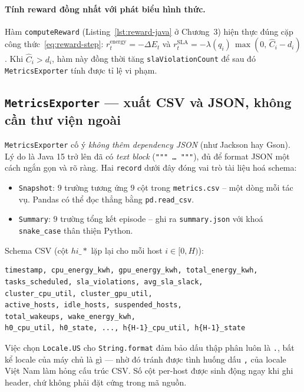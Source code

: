\paragraph{Tính reward đồng nhất với phát biểu hình thức.}
Hàm \texttt{computeReward} (Listing~\ref{lst:reward-java} ở Chương~3)
hiện thực đúng cặp công thức~\eqref{eq:reward-step}:
$r^{\mathrm{energy}}_t = -\Delta E_t$ và
$r^{\mathrm{SLA}}_t = -\lambda(q_i)\,\max(0,\,\hat C_i - d_i)$. Khi
$\hat C_i > d_i$, hàm này đồng thời tăng \texttt{slaViolationCount}
để sau đó \texttt{MetricsExporter} tính được tỉ lệ vi phạm.

\subsection{\texttt{MetricsExporter} --- xuất CSV và JSON, không cần thư viện ngoài}
\label{ssec:impl-export}

\texttt{MetricsExporter} cố ý \emph{không thêm dependency JSON} (như
Jackson hay Gson). Lý do là Java 15 trở lên đã có \emph{text block}
(\texttt{"""\,\dots\,"""}), đủ để format JSON một cách ngắn gọn và rõ
ràng. Hai \texttt{record} dưới đây đóng vai trò tài liệu hoá schema:

\begin{itemize}
  \item \texttt{Snapshot}: $9$ trường tương ứng $9$ cột trong
        \texttt{metrics.csv} -- một dòng mỗi tác vụ. Pandas có thể đọc
        thẳng bằng \texttt{pd.read\_csv}.
  \item \texttt{Summary}: $9$ trường tổng kết episode -- ghi ra
        \texttt{summary.json} với khoá \texttt{snake\_case} thân thiện
        Python.
\end{itemize}

Schema CSV (cột $h{i}\_*$ lặp lại cho mỗi host $i \in [0, H)$):
\begin{verbatim}
timestamp, cpu_energy_kwh, gpu_energy_kwh, total_energy_kwh,
tasks_scheduled, sla_violations, avg_sla_slack,
cluster_cpu_util, cluster_gpu_util,
active_hosts, idle_hosts, suspended_hosts,
total_wakeups, wake_energy_kwh,
h0_cpu_util, h0_state, ..., h{H-1}_cpu_util, h{H-1}_state
\end{verbatim}
Việc chọn \texttt{Locale.US} cho \texttt{String.format} đảm bảo dấu
thập phân luôn là \texttt{.}, bất kể locale của máy chủ là gì --- nhờ
đó tránh được tình huống dấu \texttt{,} của locale Việt Nam làm hỏng
cấu trúc CSV. Số cột per-host được sinh động ngay khi ghi header, chứ
không phải đặt cứng trong mã nguồn.

